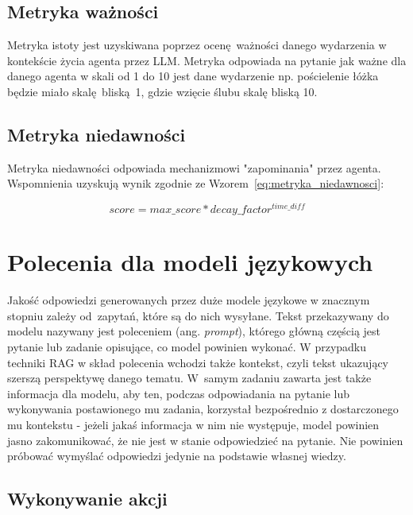 \subsection*{Metryka ważności}
Metryka istoty jest uzyskiwana
poprzez ocenę ważności danego wydarzenia w kontekście życia agenta przez LLM.
Metryka odpowiada na pytanie jak ważne dla danego agenta w skali od 1 do 10 jest
dane wydarzenie np. pościelenie łóżka będzie miało skalę bliską 1, gdzie wzięcie
ślubu skalę bliską 10.

\subsection*{Metryka niedawności}
Metryka niedawności odpowiada mechanizmowi "zapominania" przez agenta.
Wspomnienia uzyskują wynik zgodnie ze Wzorem~\eqref{eq:metryka_niedawnosci}:

\begin{equation}
 \label{eq:metryka_niedawnosci}
	score = max\_score * decay\_factor ^ {time\_diff}
\end{equation}




\section{Polecenia dla modeli językowych}

Jakość odpowiedzi generowanych przez duże modele językowe w znacznym stopniu zależy od~zapytań, które są do nich wysyłane. Tekst przekazywany do modelu nazywany jest poleceniem (ang. \textit{prompt}), którego główną częścią jest pytanie lub zadanie opisujące, co model powinien wykonać. W przypadku techniki RAG w skład polecenia wchodzi także kontekst, czyli tekst ukazujący szerszą perspektywę danego tematu. W~samym zadaniu zawarta jest także informacja dla modelu, aby ten, podczas odpowiadania na pytanie lub wykonywania postawionego mu zadania, korzystał bezpośrednio z dostarczonego mu kontekstu - jeżeli jakaś informacja w nim nie występuje, model powinien jasno zakomunikować, że nie jest w stanie odpowiedzieć na pytanie. Nie powinien próbować wymyślać odpowiedzi jedynie na podstawie własnej wiedzy.

\subsection{Wykonywanie akcji}

